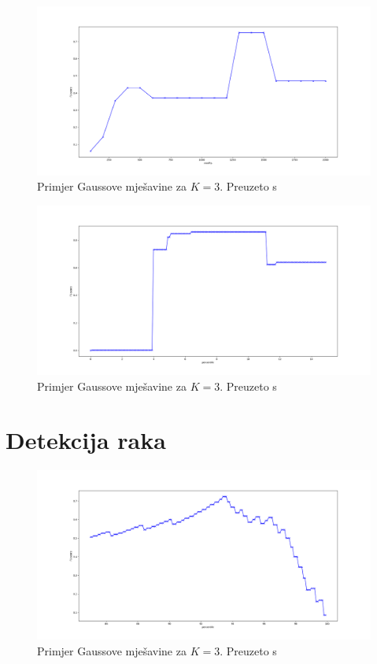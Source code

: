 \documentclass[utf8, diplomski, numeric]{fer}
\begin{document}
\begin{figure}[htb]
\includegraphics[width=1\textwidth]{images/probe-dbscan-f1.png}
\centering
\caption{Primjer Gaussove mješavine za $K = 3$. Preuzeto s  \cite{GaussianMixtureExplained}}
\label{fig:probe-dbscan}
\end{figure}

\begin{figure}[htb]
\includegraphics[width=1\textwidth]{images/probe-gauss-f1.png}
\centering
\caption{Primjer Gaussove mješavine za $K = 3$. Preuzeto s  \cite{GaussianMixtureExplained}}
\label{fig:probe-gauss}
\end{figure}

\section{Detekcija raka}

\begin{figure}[htb]
\includegraphics[width=1\textwidth]{images/cancer-kmeans-f1.png}
\centering
\caption{Primjer Gaussove mješavine za $K = 3$. Preuzeto s  \cite{GaussianMixtureExplained}}
\label{fig:cancer-kmeans}
\end{figure}
\end{document}
